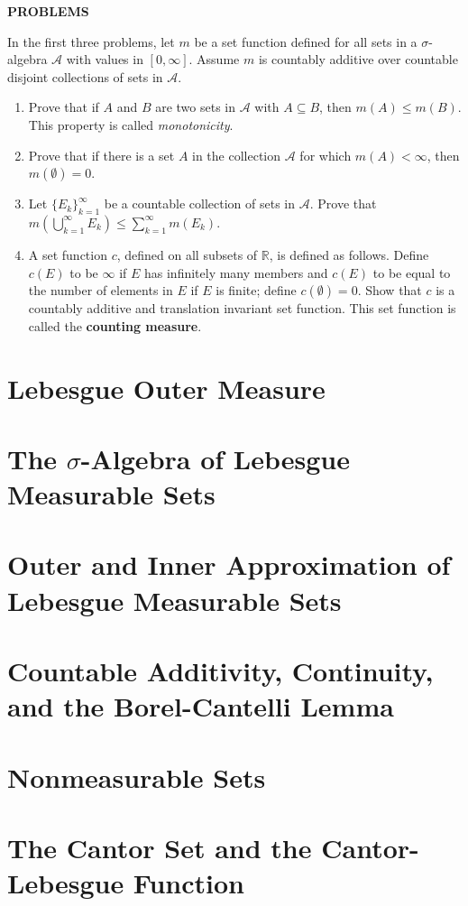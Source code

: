\documentclass[a4paper,10pt]{book}
\theoremstyle{plain} %
\begin{document}
\begin{center}
	\textbf{PROBLEMS}
\end{center}
In the first three problems, let $m$ be a set function defined for all sets in a $\sigma$-algebra $\mathcal{A}$ with values in $[0,\infty]$. Assume $m$ is countably additive over countable disjoint collections of sets in $\mathcal{A}$.
\begin{enumerate}
	\setcounter{enumi}{0}
	\item Prove that if $A$ and $B$ are two sets in $\mathcal{A}$ with $A \subseteq B$, then $m(A) \le m(B)$. This property is called \textit{monotonicity}.
	\item Prove that if there is a set $A$ in the collection $\mathcal{A}$ for which $m(A) < \infty$, then $m(\emptyset) = 0$.
	\item Let $\{E_k\}_{k=1}^\infty$ be a countable collection of sets in $\mathcal{A}$. Prove that $m(\bigcup_{k=1}^\infty E_k) \le \sum_{k=1}^\infty m(E_k).$
	\item A set function $c$, defined on all subsets of $\mathbb{R}$, is defined as follows.
	Define $c(E)$ to be $\infty$ if $E$ has infinitely many members and $c(E)$ to be equal to the number of elements in $E$ if $E$ is finite; define $c(\emptyset)=0$. Show that $c$ is a countably additive and translation invariant set function. This set function is called the \textbf{counting measure}.
\end{enumerate}


\section{Lebesgue Outer Measure}
\section{The $\sigma$-Algebra of Lebesgue Measurable Sets}
\section{Outer and Inner Approximation of Lebesgue Measurable Sets}
\section{Countable Additivity, Continuity, and the Borel-Cantelli Lemma}
\section{Nonmeasurable Sets}
\section{The Cantor Set and the Cantor-Lebesgue Function}
\end{document}
